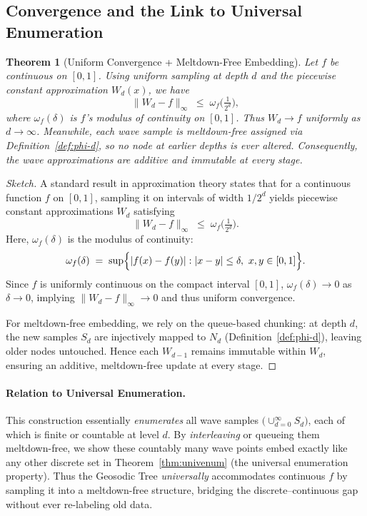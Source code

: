 \documentclass[11pt]{article}
\newtheorem{theorem}{Theorem}
\theoremstyle{definition}
\theoremstyle{remark}
\begin{document}
\subsection{Convergence and the Link to Universal Enumeration}
\label{subsec:wave-conclusion}

\begin{theorem}[Uniform Convergence + Meltdown-Free Embedding]
\label{thm:uniform-wave-conv}
  Let $f$ be continuous on $[0,1]$. Using uniform sampling at depth $d$
  and the piecewise constant approximation $W_d(x)$, we have
  \[
    \|W_d - f\|_\infty \;\le\; \omega_f\bigl(\tfrac{1}{2^d}\bigr),
  \]
  where $\omega_f(\delta)$ is $f$'s modulus of continuity on $[0,1]$. Thus
  $W_d \to f$ uniformly as $d\to\infty$. Meanwhile, each wave sample is
  meltdown-free assigned via Definition~\ref{def:phi-d}, so no node at earlier
  depths is ever altered. Consequently, the wave approximations are
  \emph{additive} and \emph{immutable} at every stage.
\end{theorem}

\begin{proof}[Sketch]
  A standard result in approximation theory states that for a continuous
  function $f$ on $[0,1]$, sampling it on intervals of width $1/2^d$ yields
  piecewise constant approximations $W_d$ satisfying
  \[
    \|W_d - f\|_\infty \;\le\; \omega_f\bigl(\tfrac{1}{2^d}\bigr).
  \]
  Here, $\omega_f(\delta)$ is the modulus of continuity:
  \[
    \omega_f(\delta)
    \;=\;
    \sup\Bigl\{
      |f(x)-f(y)| : |x-y|\le\delta,\ x,y\in[0,1]
    \Bigr\}.
  \]
  Since $f$ is uniformly continuous on the compact interval $[0,1]$,
  $\omega_f(\delta)\to 0$ as $\delta\to 0$, implying $\|W_d - f\|_\infty\to0$
  and thus uniform convergence. 

  For meltdown-free embedding, we rely on the queue-based chunking:
  at depth $d$, the new samples $S_d$ are injectively mapped to $N_d$
  (Definition~\ref{def:phi-d}), leaving older nodes untouched. Hence
  each $W_{d-1}$ remains immutable within $W_d$, ensuring an additive,
  meltdown-free update at every stage.
\end{proof}

\paragraph{Relation to Universal Enumeration.}
This construction essentially \emph{enumerates} all wave samples
$\bigl(\cup_{d=0}^{\infty} S_d\bigr)$, each of which is finite or countable at
level $d$. By \emph{interleaving} or queueing them meltdown-free, we show these
countably many wave points embed exactly like any other discrete set in
Theorem~\ref{thm:univenum} (the universal enumeration property). Thus the
Geosodic Tree \emph{universally} accommodates continuous $f$ by sampling it
into a meltdown-free structure, bridging the discrete--continuous gap without
ever re-labeling old data.
\end{document}
